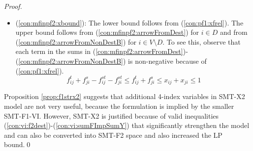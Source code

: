 \begin{proof}
\begin{itemize}
$$\sum_{k\in V_{i}\setminus\{j\}}f^t_{ki}+x_{ji}>1\Rightarrow\sum_{k\in V_{i}\setminus\{j\}}x_{ki}+x_{ji}>1\Rightarrow\sum_{k\in V_{i}}x_{ki}>1,$$
contradicting either (\ref{eq:sumToD}), if $i\in D_0$, or (\ref{con:pf1:B}), if $i\in V\setminus D$. Now let us assume that $f^*_{ij}<x_{ij}$ and (\ref{con:pf1:flowX}) is satisfied with equality. Then, $x_{ij}\leq \sum_{k\in V_i}x_{ki}$ must hold, but by Lemma \ref{lem:onedir}, $\forall t\in D_0$ if $f^t_{ji}>0$ then $f^t_{ij}=0$ and so any flow coming via $(ji)$ must leave $i$ through an arc different from $(ij)$. It is thus possible to write 
$$
x_{ij}+x_{ji} >1\Rightarrow \sum_{k\in V_i}x_{ki}+x_{ji} = \sum_{k\in V_i\setminus\{j\}}x_{ki}+x_{ji}>1,
$$
but that contradicts \ref{con:pf1:B}. Note that in this proof it is necessary to assume SMT-F1 instead of SMT-F2. The argument works with (\ref{con:pf1:xfrel}), but could not be used with stronger (\ref{con:pf2:stronger}).
\item[] (\ref{con:mfinpf2:xbound}): The lower bound follows from (\ref{con:pf1:xfrel}). The upper bound follows from (\ref{con:mfinpf2:arrowFromDest}) for $i\in D$ and from (\ref{con:mfinpf2:arrowFromNonDestB}) for $i\in V\setminus D$. To see this, observe that each term in the sums in (\ref{con:mfinpf2:arrowFromDest})-(\ref{con:mfinpf2:arrowFromNonDestB}) is non-negative because of (\ref{con:pf1:xfrel}). 
$$f^t_{ij}+f^s_{ji}-f^{st}_{ij}-f^{st}_{ji}\leq f^t_{ij}+f^s_{ji}\leq x_{ij}+x_{ji}\leq 1$$
\end{itemize}
Proposition \ref{prop:f1strx2} suggests that additional 4-index variables in SMT-X2 model are not very useful, because the formulation is implied by the smaller SMT-F1-VI. However, SMT-X2 is justified because of valid inequalities (\ref{con:vi:f2dest})-(\ref{con:vi:sumFImpSumY}) that significantly strengthen the model and can also be converted into SMT-F2 space and also increased the LP bound.\qed
\end{proof} 
